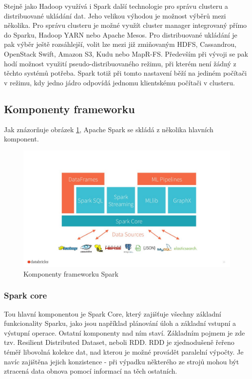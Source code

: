 \documentclass[thesis=B,czech]{FITthesis}[2012/06/26]
\begin{document}
	Stejně jako Hadoop využívá i Spark další technologie pro správu clusteru a distribuované ukládání dat. Jeho velikou výhodou je možnost výběrů mezi několika. Pro správu clusteru je možné využít cluster manager integrovaný přímo do Sparku, Hadoop YARN nebo Apache Mesos. Pro distribuované ukládání je pak výběr ještě rozsáhlejší, volit lze mezi již zmiňovaným HDFS, Cassandrou, OpenStack Swift, Amazon S3, Kudu nebo MapR-FS. Především při vývoji se pak hodí možnost využití pseudo-distribuovaného režimu, při kterém není žádný z těchto systémů potřeba. Spark totiž při tomto nastavení běží na jediném počítači v režimu, kdy jedno jádro odpovídá jednomu klientskému počítači v clusteru. 

\subsection{Komponenty frameworku}
	Jak znázorňuje obrázek \ref{fig:spark_components}, Apache Spark se skládá z několika hlavních komponent. 
	\begin{figure}[ht]
    	\centering
    	\includegraphics[width=1\textwidth]{images/spark_engine.jpg}
    	\caption{Komponenty frameworku Spark\cite{spark-components}}
    	\label{fig:spark_components}
	\end{figure}
	
\subsubsection{Spark core}
\label{spark-core}
	Tou hlavní komponentou je Spark Core, který zajišťuje všechny základní funkcionality Sparku, jako jsou například plánování úloh a základní vstupní a výstupní operace. Ostatní komponenty nad ním staví. Základním pojmem je zde tzv. Resilient Distributed Dataset, neboli RDD. RDD je zjednodušeně řeřeno téměř libovolná kolekce dat, nad kterou je možné provádět paralelní výpočty. Je navíc zajištěna jejich konzistence - při výpadku některého ze strojů mohou být ztracená data obnova pomocí informací na těch ostatních. 
	
\end{document}
